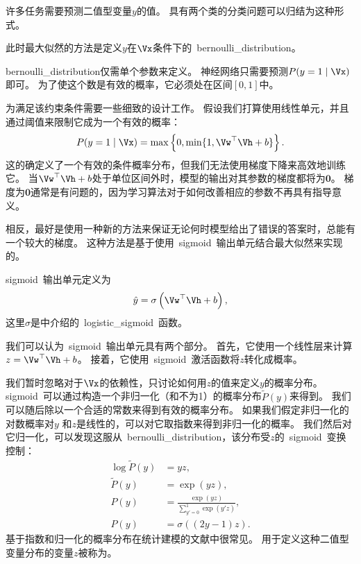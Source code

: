 许多任务需要预测二值型变量$y$的值。
具有两个类的分类问题可以归结为这种形式。

此时最大似然的方法是定义$y$在$\Vx$条件下的~\gls{bernoulli_distribution}。

\gls{bernoulli_distribution}仅需单个参数来定义。
神经网络只需要预测$P(y =1\mid\Vx)$即可。
为了使这个数是有效的概率，它必须处在区间$[0, 1]$中。

为满足该约束条件需要一些细致的设计工作。
假设我们打算使用线性单元，并且通过阈值来限制它成为一个有效的概率：
\begin{equation}
P(y=1 \mid \Vx) = \max \left \{ 0, \min \{1, \Vw^\top \Vh+b \} \right \}.
\end{equation}
这的确定义了一个有效的条件概率分布，但我们无法使用梯度下降来高效地训练它。
当$\Vw^\top \Vh+b$处于单位区间外时，模型的输出对其参数的梯度都将为$\bm{0}$。
梯度为$\bm{0}$通常是有问题的，因为学习算法对于如何改善相应的参数不再具有指导意义。


相反，最好是使用一种新的方法来保证无论何时模型给出了错误的答案时，总能有一个较大的梯度。
这种方法是基于使用~\gls{sigmoid}~输出单元结合最大似然来实现的。

\gls{sigmoid}~输出单元定义为
\begin{equation}
\hat{y} = \sigma \left (\Vw^\top \Vh + b \right ),
\end{equation}
这里$\sigma$是中介绍的~\gls{logistic_sigmoid}~函数。

我们可以认为~\gls{sigmoid}~输出单元具有两个部分。
首先，它使用一个线性层来计算$z=\Vw^\top \Vh+b$。
接着，它使用~\gls{sigmoid}~激活函数将$z$转化成概率。

我们暂时忽略对于$\Vx$的依赖性，只讨论如何用$z$的值来定义$y$的概率分布。
\gls{sigmoid}~可以通过构造一个非归一化（和不为1）的概率分布$\tilde{P}(y)$来得到。
我们可以随后除以一个合适的常数来得到有效的概率分布。
如果我们假定非归一化的对数概率对$y$ 和$z$是线性的，可以对它取指数来得到非归一化的概率。
我们然后对它归一化，可以发现这服从~\gls{bernoulli_distribution}，该分布受$z$的~\gls{sigmoid}~变换控制：
\begin{align}
\log \tilde{P}(y) &= yz,\\
\tilde{P}(y) &= \exp(yz),\\
P(y) &= \frac{\exp(yz)}{\sum_{y' = 0}^1 \exp(y' z)},\\
P(y) &= \sigma((2y-1)z).
\end{align}
基于指数和归一化的概率分布在统计建模的文献中很常见。
用于定义这种二值型变量分布的变量$z$被称为。

